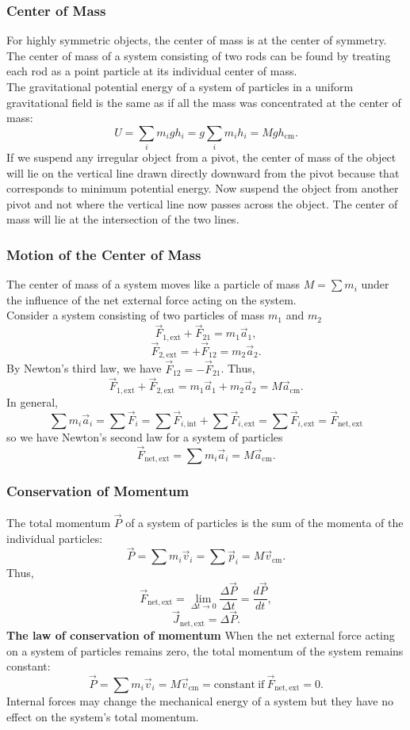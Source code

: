 \documentclass{beamer}
\begin{document}
\begin{frame}
\frametitle{Center of Mass}
For highly symmetric objects, the center of mass is at the center of symmetry. The center of mass of a system consisting of two rods can be found by treating each rod as a point particle at its individual center of mass.
\\The gravitational potential energy of a system of particles in a uniform gravitational field is the same as if all the mass was concentrated at the center of mass: $$U = \sum_i m_i gh_i = g \sum_i m_i h_i = Mgh_\mathrm{cm}.$$
If we suspend any irregular object from a pivot, the center of mass of the object will lie on the vertical line drawn directly downward from the pivot because that corresponds to minimum potential energy. Now suspend the object from another pivot and not where the vertical line now passes across the object. The center of mass will lie at the intersection of the two lines.
\end{frame}


\begin{frame}
\frametitle{Motion of the Center of Mass}
The center of mass of a system moves like a particle of mass $M = \sum{m_i}$ under the influence of the net external force acting on the system.
\\Consider a system consisting of two particles of mass $m_1$ and $m_2$ $$\vec{F}_{1\mathrm{, ext}} + \vec{F}_{21} = m_1 \vec{a}_1,$$ $$\vec{F}_{2\mathrm{, ext}} = +\vec{F}_{12} = m_2 \vec{a}_2.$$
By Newton's third law, we have $\vec{F}_{12} = -\vec{F}_{21}$. Thus, $$\vec{F}_{1\mathrm{, ext}} + \vec{F}_{2\mathrm{, ext}} = m_1 \vec{a}_1 +m_2 \vec{a}_2 = M \vec{a}_\mathrm{cm}.$$
In general, $$\sum m_i \vec{a}_i = \sum \vec{F}_i = \sum \vec{F}_{i\mathrm{, int}} + \sum \vec{F}_{i\mathrm{, ext}} = \sum \vec{F}_{i\mathrm{, ext}} = \vec{F}_\mathrm{net, ext}$$ so we have Newton's second law for a system of particles $$\vec{F}_\mathrm{net, ext} = \sum m_i \vec{a}_i = M \vec{a}_\mathrm{cm}.$$
\end{frame}

\begin{frame}
\frametitle{Conservation of Momentum}
The total momentum $\vec{P}$ of a system of particles is the sum of the momenta of the individual particles: $$\vec{P} = \sum m_i \vec{v}_i = \sum \vec{p}_i = M \vec{v}_\mathrm{cm}.$$
Thus, $$\vec{F}_\mathrm{net, ext} = \lim_{\Delta{t} \to 0}{\frac{\Delta{\vec{P}}}{\Delta{t}}} = \frac{d\vec{P}}{dt},$$ $$\vec{J}_\mathrm{net, ext} = \Delta{\vec{P}}.$$
\textbf{The law of conservation of momentum} When the net external force acting on a system of particles remains zero, the total momentum of the system remains constant: $$\vec{P} = \sum m_i \vec{v}_i = M \vec{v}_\mathrm{cm} = \mathrm{constant\ if\ } \vec{F}_\mathrm{net, ext} = 0.$$
Internal forces may change the mechanical energy of a system but they have no effect on the system's total momentum.
\end{frame}
\end{document}
